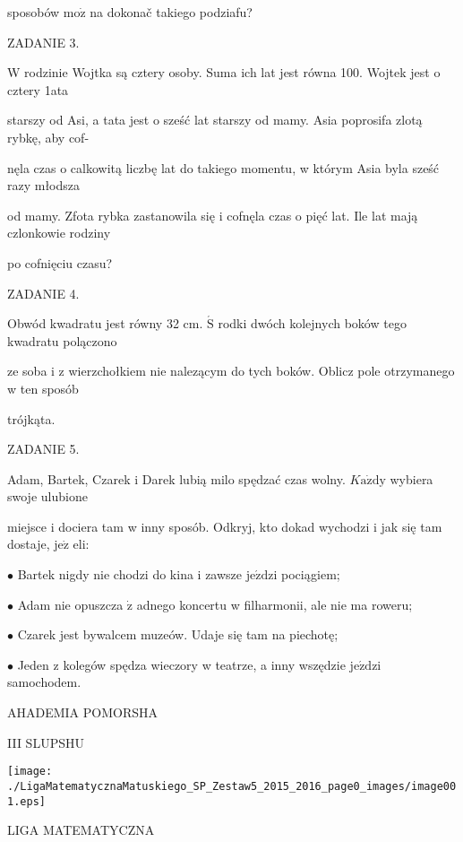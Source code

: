 \documentclass[a4paper,12pt]{article}
\begin{document}
sposobów $\mathrm{m}\mathrm{o}\dot{\mathrm{z}}$ na dokonač takiego podziafu?

ZADANIE 3.

W rodzinie Wojtka są cztery osoby. Suma ich lat jest równa 100. Wojtek jest o cztery 1ata

starszy od Asi, a tata jest o sześć lat starszy od mamy. Asia poprosifa zlotą rybkę, aby cof-

nęla czas o calkowitą liczbę lat do takiego momentu, w którym Asia byla sześć razy młodsza

od mamy. Zfota rybka zastanowila się i cofnęla czas o pięć lat. Ile lat mają czlonkowie rodziny

po cofnięciu czasu?

ZADANIE 4.

Obwód kwadratu jest równy 32 cm. $\acute{\mathrm{S}}$ rodki dwóch kolejnych boków tego kwadratu polączono

ze soba i z wierzchołkiem nie nalezącym do tych boków. Oblicz pole otrzymanego w ten sposób

trójkąta.

ZADANIE 5.

Adam, Bartek, Czarek i Darek lubią milo spędzać czas wolny. $K\mathrm{a}\dot{\mathrm{z}}\mathrm{d}\mathrm{y}$ wybiera swoje ulubione

miejsce i dociera tam w inny sposób. Odkryj, kto dokad wychodzi i jak się tam dostaje, $\mathrm{j}\mathrm{e}\dot{\mathrm{z}}$ eli:

$\bullet$ Bartek nigdy nie chodzi do kina i zawsze $\mathrm{j}\mathrm{e}\acute{\mathrm{z}}\mathrm{d}\mathrm{z}\mathrm{i}$ pociągiem;

$\bullet$ Adam nie opuszcza $\dot{\mathrm{z}}$ adnego koncertu w filharmonii, ale nie ma roweru;

$\bullet$ Czarek jest bywalcem muzeów. Udaje się tam na piechotę;

$\bullet$ Jeden z kolegów spędza wieczory w teatrze, a inny wszędzie $\mathrm{j}\mathrm{e}\acute{\mathrm{z}}\mathrm{d}\mathrm{z}\mathrm{i}$ samochodem.






AHADEMIA POMORSHA

III SLUPSHU
\begin{center}
\texttt{[image: ./LigaMatematycznaMatuskiego\_SP\_Zestaw5\_2015\_2016\_page0\_images/image001.eps]}
\end{center}
LIGA MATEMATYCZNA
\end{document}
